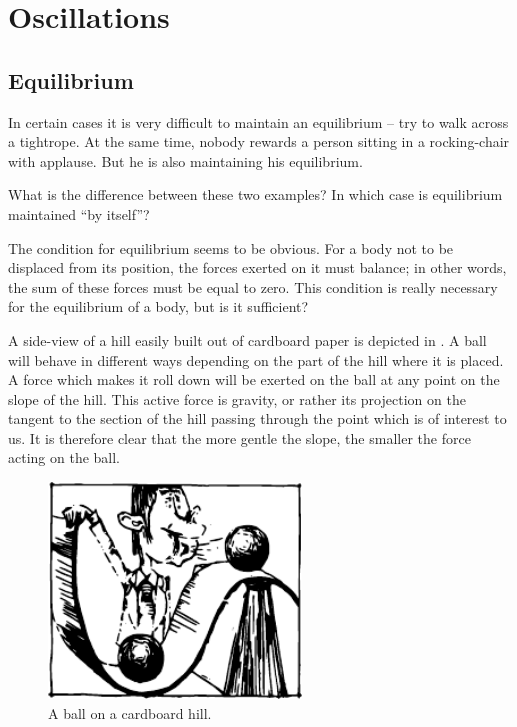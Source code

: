 

\cleardoublepage
\chapter{Oscillations}


\section{Equilibrium}


In certain cases it is very difficult to maintain an equilibrium -- try to walk across a tightrope. At the same time,
nobody rewards a person sitting in a rocking-chair with
applause. But he is also maintaining his equilibrium.

What is the difference between these two examples?
In which case is equilibrium maintained ``by itself''?

The condition for equilibrium seems to be obvious. For
a body not to be displaced from its position, the forces
exerted on it must balance; in other words, the sum of
these forces must be equal to zero. This condition is
really necessary for the equilibrium of a body, but is it
sufficient?

A side-view of a hill easily built out of cardboard paper
is depicted in . A ball will behave in different
ways depending on the part of the hill where it is placed. A force which makes it roll down will be exerted on the
ball at any point on the slope of the hill. This active force
is gravity, or rather its projection on the tangent to the
section of the hill passing through the point which is of
interest to us. It is therefore clear that the more gentle
the slope, the smaller the force acting on the ball.

\begin{figure}[!ht]
\centering
\includegraphics[width=0.6\textwidth]{figures/fig-04-01.pdf}
\caption{A ball on a cardboard hill.}
\label{fig-4.01}
\end{figure}

